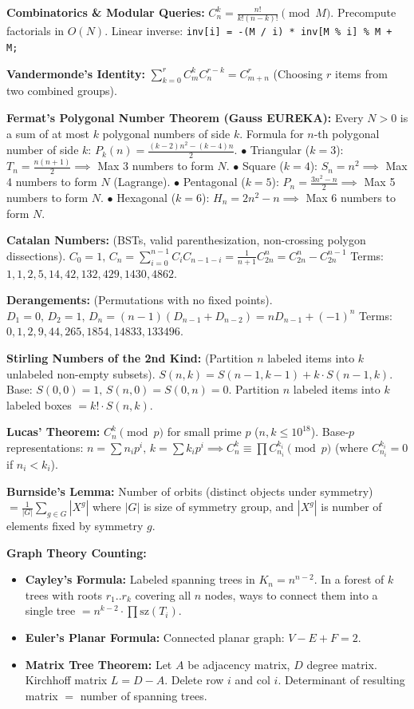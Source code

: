 
\textbf{Combinatorics \& Modular Queries:}
$C_n^k = \frac{n!}{k!(n-k)!} \pmod M$. Precompute factorials in $O(N)$. Linear inverse:
\lstinline|inv[i] = -(M / i) * inv[M % i] % M + M;|

\textbf{Vandermonde's Identity:} $\sum_{k=0}^r C_m^k C_n^{r-k} = C_{m+n}^r$ (Choosing $r$ items from two combined groups).

\textbf{Fermat's Polygonal Number Theorem (Gauss EUREKA):}
Every $N > 0$ is a sum of at most $k$ polygonal numbers of side $k$.
Formula for $n$-th polygonal number of side $k$: $P_k(n) = \frac{(k - 2)n^2 - (k - 4)n}{2}$.
$\bullet$ Triangular ($k=3$): $T_n = \frac{n(n+1)}{2} \implies$ Max 3 numbers to form $N$.
$\bullet$ Square ($k=4$): $S_n = n^2 \implies$ Max 4 numbers to form $N$ (Lagrange).
$\bullet$ Pentagonal ($k=5$): $P_n = \frac{3n^2-n}{2} \implies$ Max 5 numbers to form $N$.
$\bullet$ Hexagonal ($k=6$): $H_n = 2n^2-n \implies$ Max 6 numbers to form $N$.

\textbf{Catalan Numbers:} (BSTs, valid parenthesization, non-crossing polygon dissections).
$C_0 = 1, \, C_n = \sum_{i=0}^{n-1} C_i C_{n-1-i} = \frac{1}{n+1} C_{2n}^n = C_{2n}^n - C_{2n}^{n-1}$
Terms: $1, 1, 2, 5, 14, 42, 132, 429, 1430, 4862$.

\textbf{Derangements:} (Permutations with no fixed points).
$D_1 = 0, \, D_2 = 1, \, D_n = (n-1)(D_{n-1} + D_{n-2}) = n D_{n-1} + (-1)^n$
Terms: $0, 1, 2, 9, 44, 265, 1854, 14833, 133496$.

\textbf{Stirling Numbers of the 2nd Kind:} (Partition $n$ labeled items into $k$ unlabeled non-empty subsets).
$S(n, k) = S(n-1, k-1) + k \cdot S(n-1, k)$. Base: $S(0, 0) = 1, \, S(n, 0) = S(0, n) = 0$.
Partition $n$ labeled items into $k$ labeled boxes $= k! \cdot S(n, k)$.

\textbf{Lucas' Theorem:} $C_n^k \pmod p$ for small prime $p$ ($n, k \le 10^{18}$). Base-$p$ representations:
$n = \sum n_i p^i, \, k = \sum k_i p^i \implies C_n^k \equiv \prod C_{n_i}^{k_i} \pmod p$ (where $C_{n_i}^{k_i} = 0$ if $n_i < k_i$).

\textbf{Burnside's Lemma:} Number of orbits (distinct objects under symmetry) $= \frac{1}{|G|} \sum_{g \in G} |X^g|$ where $|G|$ is size of symmetry group, and $|X^g|$ is number of elements fixed by symmetry $g$.

\textbf{Graph Theory Counting:}
\begin{itemize}
    \item \textbf{Cayley's Formula:} Labeled spanning trees in $K_n = n^{n-2}$. In a forest of $k$ trees with roots $r_1..r_k$ covering all $n$ nodes, ways to connect them into a single tree $= n^{k-2} \cdot \prod \text{sz}(T_i)$.
    \item \textbf{Euler's Planar Formula:} Connected planar graph: $V - E + F = 2$.
    \item \textbf{Matrix Tree Theorem:} Let $A$ be adjacency matrix, $D$ degree matrix. Kirchhoff matrix $L = D - A$. Delete row $i$ and col $i$. Determinant of resulting matrix $=$ number of spanning trees.
\end{itemize}

